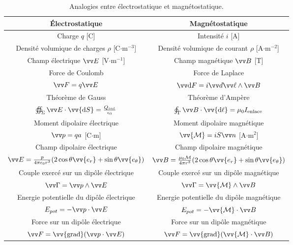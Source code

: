 \documentclass[11pt,fleqn]{book} %
\newcommand{\dd}{\mathrm{d}}
\newcommand{\grad}{\vv{\mathrm{grad}}}
\begin{document}
\begin{table}[htbp]
\centering
\begin{tabular}{cc}
\toprule
\textbf{\'{E}lectrostatique} & \textbf{Magnétostatique}\\
\midrule
Charge $q$ [C] & Intensité $i$ [A] \\
\midrule
Densité volumique de charges $\rho$ [C$\cdot$m$^{-3}$] & Densité volumique de courant $\rho$ [A$\cdot$m$^{-2}$] \\
\midrule
Champ électrique $\vv E$ [V$\cdot$m$^{-1}$] & Champ magnétique $\vv B$ [T] \\
\midrule
Force de Coulomb & Force de Laplace \\
$\vv F = q \vv E$ & $\vv \dd F = i \vv d \vv \ell \wedge \vv B$ \\
\midrule
Théorème de Gauss & Théorème d'Ampère \\
$\oiint_\Sigma \vv E \cdot \vv{\dd S} = \frac{Q_{int}}{\epsilon_0}$ & $\oint_\Gamma \vv B \cdot \vv{\dd \ell} = \mu_0 I_{\mathrm{enlace}}$ \\
\midrule
Moment dipolaire électrique & Moment dipolaire magnétique \\
$\vv p = q a$ [C$\cdot$m] & $\vv{\mathcal{M}} = i S \vv n$ [A$\cdot$m$^2$] \\
\midrule
Champ dipolaire électrique & Champ dipolaire magnétique \\
$\vv E = \frac{p}{4 \pi \epsilon_0 r^3} ( 2 \cos \theta \vv{e_r} + \sin \theta \vv{e_\theta} )$ & $\vv B = \frac{\mu_0 \mathcal{M}}{4 \pi r^3} ( 2 \cos \theta \vv{e_r} + \sin \theta \vv{e_\theta} )$ \\
\midrule
Couple exercé sur un dipôle électrique & Couple exercé sur un dipôle magnétique \\
$\vv \Gamma = \vv p \wedge \vv E$ & $\vv \Gamma = \vv{\mathcal{M}} \wedge \vv B$ \\
\midrule
Energie potentielle du dipôle électrique & Energie potentielle du dipôle magnétique \\
$E_{pot} = - \vv p \cdot \vv E$ & $E_{pot} = - \vv{\mathcal{M}} \cdot \vv B$ \\
\midrule
\midrule
Force sur un dipôle électrique & Force sur un dipôle magnétique \\
$\vv F = \grad( \vv p \cdot \vv E)$ & $\vv F = \grad( \vv{\mathcal{M}} \cdot \vv B)$ \\
\bottomrule
\end{tabular}
\caption{Analogies entre électrostatique et magnétostatique.}
\end{table}
\end{document}
